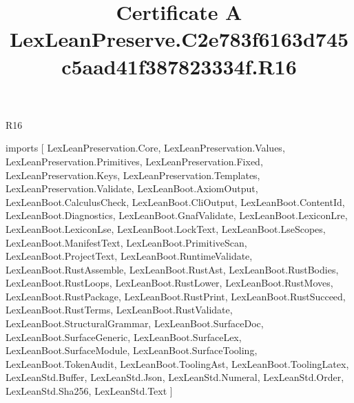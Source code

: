 \begin{lexlean}{R16}
\title{Certificate A LexLeanPreserve.C2e783f6163d745c5aad41f387823334f.R16}
\begin{coremodule}
imports [
  LexLeanPreservation.Core,
  LexLeanPreservation.Values,
  LexLeanPreservation.Primitives,
  LexLeanPreservation.Fixed,
  LexLeanPreservation.Keys,
  LexLeanPreservation.Templates,
  LexLeanPreservation.Validate,
  LexLeanBoot.AxiomOutput,
  LexLeanBoot.CalculusCheck,
  LexLeanBoot.CliOutput,
  LexLeanBoot.ContentId,
  LexLeanBoot.Diagnostics,
  LexLeanBoot.GnafValidate,
  LexLeanBoot.LexiconLre,
  LexLeanBoot.LexiconLse,
  LexLeanBoot.LockText,
  LexLeanBoot.LseScopes,
  LexLeanBoot.ManifestText,
  LexLeanBoot.PrimitiveScan,
  LexLeanBoot.ProjectText,
  LexLeanBoot.RuntimeValidate,
  LexLeanBoot.RustAssemble,
  LexLeanBoot.RustAst,
  LexLeanBoot.RustBodies,
  LexLeanBoot.RustLoops,
  LexLeanBoot.RustLower,
  LexLeanBoot.RustMoves,
  LexLeanBoot.RustPackage,
  LexLeanBoot.RustPrint,
  LexLeanBoot.RustSucceed,
  LexLeanBoot.RustTerms,
  LexLeanBoot.RustValidate,
  LexLeanBoot.StructuralGrammar,
  LexLeanBoot.SurfaceDoc,
  LexLeanBoot.SurfaceGeneric,
  LexLeanBoot.SurfaceLex,
  LexLeanBoot.SurfaceModule,
  LexLeanBoot.SurfaceTooling,
  LexLeanBoot.TokenAudit,
  LexLeanBoot.ToolingAst,
  LexLeanBoot.ToolingLatex,
  LexLeanStd.Buffer,
  LexLeanStd.Json,
  LexLeanStd.Numeral,
  LexLeanStd.Order,
  LexLeanStd.Sha256,
  LexLeanStd.Text
]


\end{coremodule}
\end{lexlean}

